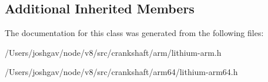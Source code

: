 \subsection*{Additional Inherited Members}


The documentation for this class was generated from the following files\+:\begin{DoxyCompactItemize}
\item 
/\+Users/joshgav/node/v8/src/crankshaft/arm/lithium-\/arm.\+h\item 
/\+Users/joshgav/node/v8/src/crankshaft/arm64/lithium-\/arm64.\+h\end{DoxyCompactItemize}
